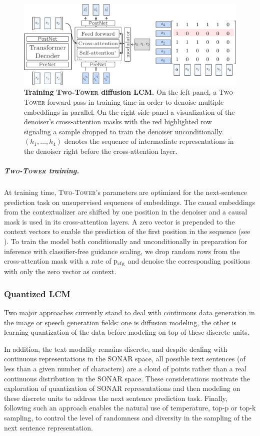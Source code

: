 \documentclass[twoside,11pt]{fairmeta}
\newcommand{\lcm}{\textsc{LCM}\xspace}
\newcommand{\twotower}{\textsc{Two-Tower}\xspace}
\newcommand{\ctxenc}{contextualizer\xspace}
\newcommand{\denoiser}{denoiser\xspace}
\def\rp{{\textnormal{p}}}
\begin{document}
\begin{figure}[!t]
    \centering
    \includegraphics[width=.8\linewidth]{figures/two_tower_training.pdf}
    \caption{\textbf{Training \twotower diffusion \lcm.} On the left panel, a \twotower forward pass in training time in order to denoise multiple embeddings in parallel. On the right side panel a visualization of the \denoiser's cross-attention masks with the red highlighted row signaling a sample dropped to train the \denoiser unconditionally. $(h_1, \ldots, h_4)$ denotes the sequence of intermediate representations in the \denoiser right before the cross-attention layer.}
    \label{fig:archi:twotower:attn}
\end{figure}

\vspace{-2mm} %
\subparagraph{\twotower training.}
At training time, \twotower's parameters are optimized for the next-sentence prediction task on unsupervised sequences of embeddings. The causal embeddings from the \ctxenc are shifted by one position in the \denoiser and a causal mask is used in its cross-attention layers. A zero vector is prepended to the context vectors to enable the prediction of the first position in the sequence (see ).
To train the model both conditionally and unconditionally in preparation for inference with classifier-free guidance scaling, we drop random rows from the cross-attention mask with a rate of $\rp_\text{cfg}$ and denoise the corresponding positions with only the zero vector as context.




\subsubsection{Quantized \lcm}
\label{sec:arch:quantlcm}
Two major approaches currently stand to deal with continuous data generation in the image or speech generation fields: one is diffusion modeling, the other is learning quantization of the data before modeling on top of these discrete units.

In addition, the text modality remains discrete, and despite dealing with continuous representations in the SONAR space, all possible text sentences (of less than a given number of characters) are a cloud of points rather than a real continuous distribution in the SONAR space. 
These considerations motivate the exploration of quantization of SONAR representations and then modeling on these discrete units to address the next sentence prediction task. Finally, following such an approach enables the natural use of temperature, top-p or top-k sampling, to control the level of randomness and diversity in the sampling of the next sentence representation.
\end{document}
